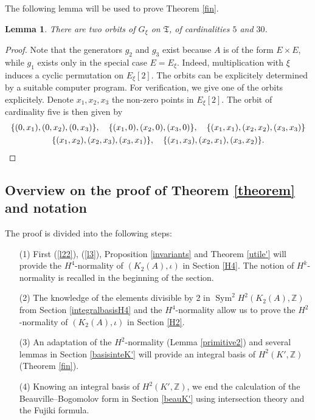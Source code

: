 \documentclass{alggeom}
\DeclareMathOperator{\Sym}{Sym}
\newcommand{\Z}{\mathbb{Z}}
\theoremstyle{plain}
\newtheorem{lemma}[theorem]{Lemma}
\theoremstyle{definition}
\theoremstyle{remark}
\begin{document}
The following lemma will be used to prove Theorem \ref{fin}.
\begin{lemma}\label{orbitesG}
There are two orbits of $G_\xi$ on $\mathfrak T$, of cardinalities $5$ and $30$.
\end{lemma}
\begin{proof}
Note that the generators $g_2$ and $g_3$ exist because $A$ is of the form $E\times E$, while $g_1$ exists only in the special case $E=E_\xi$. Indeed, multiplication with $\xi$ induces a cyclic permutation on $E_\xi[2]$. 
The orbits can be explicitely determined by a suitable computer program. For verification, we give one of the orbits explicitely.
Denote $x_1,x_2,x_3$ the non-zero points in $E_\xi[2]$. The orbit of cardinality five is then given by
\begin{gather*}
\{(0,x_1),(0,x_2),(0,x_3)\} , \quad  \{(x_1,0),(x_2,0),(x_3,0)\},\quad  \{(x_1,x_1),(x_2,x_2),(x_3,x_3)\}  \\
 \{(x_1,x_2),(x_2,x_3),(x_3,x_1)\}, \quad  \{(x_1,x_3),(x_2,x_1),(x_3,x_2)\}. \qedhere
\end{gather*}
\end{proof}
\subsection{Overview on the proof of Theorem \ref{theorem} and notation}\label{nota}
The proof is divided into the following steps:
\begin{itemize}
\item[(1)]
First (\ref{l22}), (\ref{l3}), Proposition \ref{invariants} and Theorem \ref{utile'} will provide the $H^4$-normality of $(K_2(A),\iota)$ in Section \ref{H4}. The notion of $H^k$-normality is recalled in the beginning of the section.
\item[(2)]
The knowledge of the elements divisible by 2 in $\Sym^{2} H^{2}(K_2(A),\Z)$ from Section \ref{integralbasisH4} and the $H^4$-normality allow us to prove the $H^2$-normality of $(K_2(A),\iota)$ in Section \ref{H2}. 
\item[(3)]
An adaptation of the $H^2$-normality (Lemma \ref{primitive2}) and several lemmas in Section \ref{basisinteK'} will provide an integral basis of $H^{2}(K',\Z)$ (Theorem \ref{fin}).
\item[(4)]
Knowing an integral basis of $H^{2}(K',\Z)$, we end the calculation of the Beauville--Bogomolov form in Section \ref{beauK'} using intersection theory and the Fujiki formula.
\end{itemize}
\end{document}
